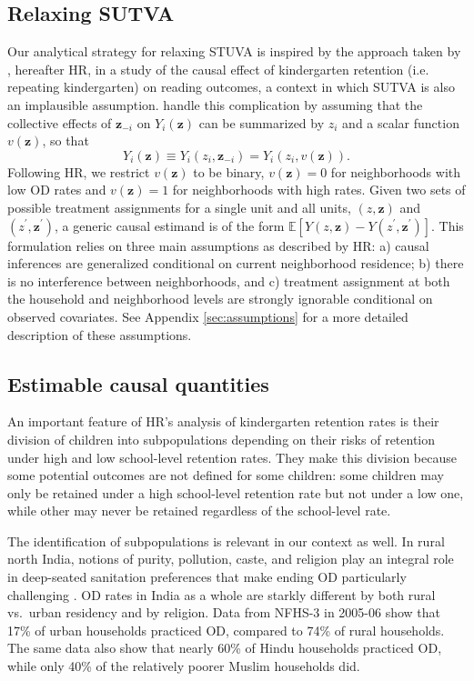 \documentclass[12pt,a4paper,titlepage]{article}
\begin{document}
\subsection{Relaxing SUTVA}
Our analytical strategy for relaxing STUVA is inspired by the approach taken by \cite{hong_raudenbush}, hereafter HR, in a study of the causal effect of kindergarten retention (i.e. repeating kindergarten) on reading outcomes, a context in which SUTVA is also an implausible assumption. \cite{hong_raudenbush} handle this complication by assuming that the collective effects of $\mathbf{z}_{-i}$ on $Y_i(\mathbf{z})$ can be summarized by $z_i$ and a scalar function $v(\mathbf{z})$, so that
\begin{equation}\label{eq:hr_pot_out}
	Y_i(\mathbf{z}) \equiv Y_i(z_i, \mathbf{z}_{-i}) = Y_i(z_i, v(\mathbf{z})).
\end{equation}
Following HR, we restrict $v(\mathbf{z})$ to be binary, $v(\mathbf{z}) = 0$ for neighborhoods with low OD rates and $v(\mathbf{z}) = 1$ for neighborhoods with high rates. Given two sets of possible treatment assignments for a single unit and all units, $(z, \mathbf{z})$ and $(z^{\prime}, \mathbf{z}^{\prime})$, a generic causal estimand is of the form $\mathbb{E}[Y(z, \mathbf{z}) - Y(z^{\prime}, \mathbf{z}^{\prime})]$. This formulation relies on three main assumptions as described by HR: a) causal inferences are generalized conditional on current neighborhood residence; b) there is no interference between neighborhoods, and c) treatment assignment at both the household and neighborhood levels are strongly ignorable conditional on observed covariates. See Appendix \ref{sec:assumptions} for a more detailed description of these assumptions.

\subsection{Estimable causal quantities}
An important feature of HR's analysis of kindergarten retention rates is their division of children into subpopulations depending on their risks of retention under high and low school-level retention rates. They make this division because some potential outcomes are not defined for some children: some children may only be retained under a high school-level retention rate but not under a low one, while other may never be retained regardless of the school-level rate.

The identification of subpopulations is relevant in our context as well. In rural north India, notions of purity, pollution, caste, and religion play an integral role in deep-seated sanitation preferences that make ending OD particularly challenging \citep{squat, san_culture}. OD rates in India as a whole are starkly different by both rural vs.\ urban residency and by religion. Data from NFHS-3 in 2005-06 show that 17\% of urban households practiced OD, compared to 74\% of rural households. The same data also show that nearly 60\% of Hindu households practiced OD, while only 40\% of the relatively poorer Muslim households did.
\end{document}
